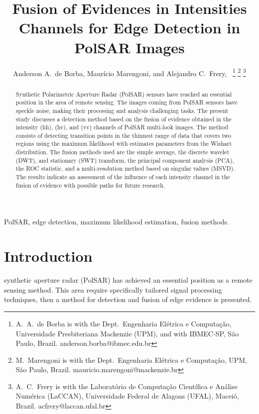 \documentclass[journal]{IEEEtran}
\begin{document}
\title{Fusion of Evidences in Intensities Channels for Edge Detection in PolSAR Images}
\author{Anderson A.\ de Borba, Maurício Marengoni, and Alejandro C.\ Frery,~%
\thanks{A.\ A.\ de Borba is with the Dept.\ Engenharia Elétrica e Computação, Universidade Presbiteriana Mackenzie (UPM), and with IBMEC-SP, São Paulo, Brazil. anderson.borba@ibmec.edu.br}
\thanks{M.\ Marengoni is with the Dept.\ Engenharia Elétrica e Computação,
UPM, São Paulo, Brazil. mauricio.marengoni@mackenzie.br}
\thanks{A.\ C.\ Frery is with the Laboratório de Computação Científica e Análise Numérica (LaCCAN), Universidade Federal de Alagoas (UFAL), Maceió, Brazil. acfrery@laccan.ufal.br}}

\maketitle

\begin{abstract}
Synthetic Polarimetric Aperture Radar (PolSAR) sensors have reached an essential position in the area of remote sensing. 
The images coming from PolSAR sensors have speckle noise, making their processing and analysis challenging tasks. 
The present study discusses a detection method based on the fusion of evidence obtained in the intensity (hh), (hv), and (vv) channels of PolSAR multi-look images. 
The method consists of detecting transition points in the thinnest range of data that covers two regions using the maximum likelihood with estimates parameters from the Wishart distribution. 
The fusion methods used are the simple average, the discrete wavelet (DWT), and stationary (SWT) transform, the principal component analysis (PCA), the ROC statistic, and a multi-resolution method based on singular values (MSVD). 
The results indicate an assessment of the influence of each intensity channel in the fusion of evidence with possible paths for future research.
\end{abstract}

\begin{IEEEkeywords}
PolSAR, edge detection, maximum likelihood estimation, fusion methods. 
\end{IEEEkeywords}

\section{Introduction}\label{sec_01}
 synthetic aperture radar (PolSAR) has achieved an essential position as a remote sensing method. This area require specifically tailored signal processing techniques, then a method for detection and fusion of edge evidence is presented. 
\end{document}
